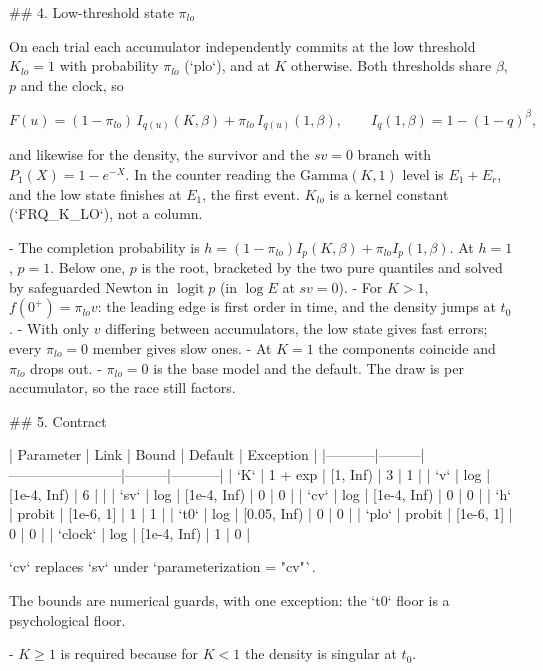 ## 4. Low-threshold state \(\pi_{lo}\)

On each trial each accumulator independently commits at the low threshold
\(K_{lo}=1\) with probability \(\pi_{lo}\) (`plo`), and at \(K\) otherwise.
Both thresholds share \(\beta\), \(p\) and the clock, so

\[
  F(u)=(1-\pi_{lo})\,I_{q(u)}(K,\beta)+\pi_{lo}\,I_{q(u)}(1,\beta),
  \qquad I_q(1,\beta)=1-(1-q)^\beta,
\]

and likewise for the density, the survivor and the \(sv=0\) branch with
\(P_1(X)=1-e^{-X}\). In the counter reading the \(\mathrm{Gamma}(K,1)\) level is
\(E_1+E_r\), and the low state finishes at \(E_1\), the first event.
\(K_{lo}\) is a kernel constant (`FRQ_K_LO`), not a column.

- The completion probability is
  \(h=(1-\pi_{lo})I_p(K,\beta)+\pi_{lo}I_p(1,\beta)\). At \(h=1\), \(p=1\).
  Below one, \(p\) is the root, bracketed by the two pure quantiles and solved
  by safeguarded Newton in \(\operatorname{logit}p\) (in \(\log E\) at
  \(sv=0\)).
- For \(K>1\), \(f(0^+)=\pi_{lo}v\): the leading edge is first order in time,
  and the density jumps at \(t_0\).
- With only \(v\) differing between accumulators, the low state gives fast
  errors; every \(\pi_{lo}=0\) member gives slow ones.
- At \(K=1\) the components coincide and \(\pi_{lo}\) drops out.
- \(\pi_{lo}=0\) is the base model and the default. The draw is per
  accumulator, so the race still factors.

## 5. Contract

| Parameter | Link    | Bound                  | Default | Exception |
|-----------|---------|------------------------|---------|-----------|
| `K`       | 1 + exp | [1, Inf)               | 3       | 1         |
| `v`       | log     | [1e-4, Inf)            | 6       |           |
| `sv`      | log     | [1e-4, Inf)            | 0       | 0         |
| `cv`      | log     | [1e-4, Inf)            | 0       | 0         |
| `h`       | probit  | [1e-6, 1]              | 1       | 1         |
| `t0`      | log     | [0.05, Inf)            | 0       | 0         |
| `plo`     | probit  | [1e-6, 1]              | 0       | 0         |
| `clock`   | log     | [1e-4, Inf)            | 1       | 0         |

`cv` replaces `sv` under `parameterization = "cv"`.

The bounds are numerical guards, with one exception: the `t0` floor is a
psychological floor.

- \(K\ge1\) is required because for \(K<1\) the density is singular at
  \(t_0\).

